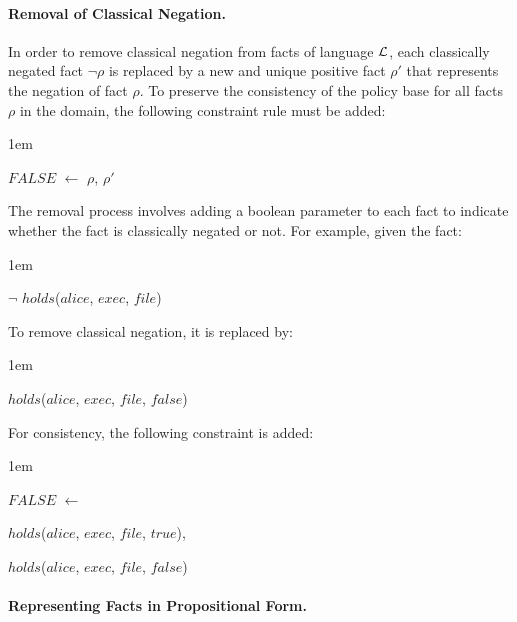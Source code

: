 \documentclass[global,twocolumn,final]{svjour}
\newenvironment{vquote}
  {\begin{list}{}{\leftmargin 1em}\item[]}
  {\end{list}}
\begin{document}
        \paragraph{Removal of Classical Negation.}

          In order to remove classical negation from facts of language
          ${\cal L}$, each classically negated fact $\lnot$$\rho$ is replaced
          by a new and unique positive fact $\rho'$ that represents the
          negation of fact $\rho$. To preserve the consistency of the policy
          base for all facts $\rho$ in the domain, the following constraint
          rule must be added:

          \begin{vquote}
            $FALSE$ $\leftarrow$ $\rho$, $\rho'$
          \end{vquote}

          The removal process involves adding a boolean parameter to each fact
          to indicate whether the fact is classically negated or not. For
          example, given the fact:

          \begin{vquote}
            $\lnot$ $holds$($alice$, $exec$, $file$)
          \end{vquote}

          \noindent
          To remove classical negation, it is replaced by:

          \begin{vquote}
            $holds$($alice$, $exec$, $file$, $false$)
          \end{vquote}

          \noindent
          For consistency, the following constraint is added:

          \begin{vquote}
            $FALSE$ $\leftarrow$

            \hspace{1em}
            $holds$($alice$, $exec$, $file$, $true$),

            \hspace{1em}
            $holds$($alice$, $exec$, $file$, $false$)
          \end{vquote}

        \paragraph{Representing Facts in Propositional Form.}
\end{document}
